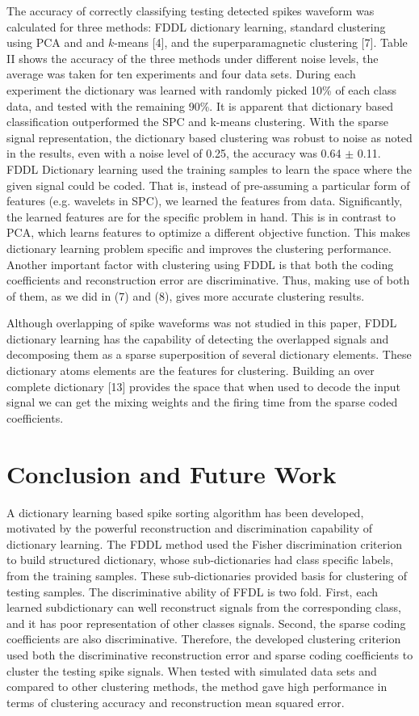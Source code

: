 \documentclass[conference]{IEEEtran}
\begin{document}
	The accuracy of correctly classifying testing detected spikes waveform was calculated for three methods: FDDL dictionary learning, standard clustering using PCA and and $k$-means [4], and the superparamagnetic clustering [7]. Table II shows the accuracy of the three methods under different noise levels, the average was taken for ten experiments and four
	data sets. During each experiment the dictionary was learned with randomly picked 10\% of each class data, and tested with the remaining 90\%. It is apparent that dictionary based classification outperformed the SPC and k-means clustering. With the sparse signal representation, the dictionary based clustering was robust to noise as noted in the results, even with a noise level of 0.25, the accuracy was 0.64 $\pm$ 0.11. FDDL Dictionary learning used the training samples to learn the space where the given signal could be coded. That is, instead of pre-assuming a particular form of features (e.g. wavelets in SPC), we learned the features from data. Significantly, the learned features are for the specific problem in hand. This is in contrast to PCA, which learns features to optimize a different objective function. This makes dictionary learning problem specific and improves the clustering performance. Another important factor with clustering using FDDL is that both the coding coefficients and reconstruction error are discriminative. Thus, making use of both of them, as we did in (7) and (8), gives more accurate clustering results.
	
	Although overlapping of spike waveforms was not studied in this paper, FDDL dictionary learning has the capability of detecting the overlapped signals and decomposing them as a sparse superposition of several dictionary elements. These dictionary atoms elements are the features for clustering. Building an over complete dictionary [13] provides the space that when used to decode the input signal we can get the mixing weights and the firing time from the sparse coded coefficients.
	
	\section{Conclusion and Future Work}
	A dictionary learning based spike sorting algorithm has been developed, motivated by the powerful reconstruction and discrimination capability of dictionary learning. The FDDL method used the Fisher discrimination criterion to build structured dictionary, whose sub-dictionaries had class specific labels, from the training samples. These sub-dictionaries provided basis for clustering of testing samples. The discriminative ability of FFDL is two fold. First, each learned subdictionary can well reconstruct signals from the corresponding class, and it has poor representation of other classes signals. Second, the sparse coding coefficients are also discriminative. Therefore, the developed clustering criterion used both the discriminative reconstruction error and sparse coding coefficients to cluster the testing spike signals. When tested with simulated data sets and compared to other clustering methods, the method gave high performance in terms of clustering accuracy and reconstruction mean squared error.
\end{document}
